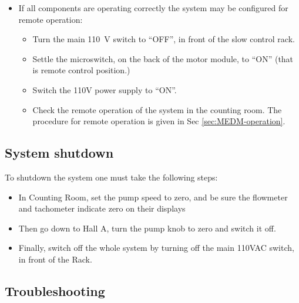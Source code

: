 {\begin{itemize}
\begin{itemize}
\item Switch the motor driver to ``manual'' mode. 
\item Go to the motor driver chassis and move the motor up and down by pressing
the switches on the front panel. 
\item Check that the motor is moving and make sure that the encoder display
is on, and working during the motor movement. 
\end{itemize}
\item If all components are operating correctly the system may be configured
for remote operation:

\begin{itemize}
\item Turn the main 110~V switch to ``OFF'', in front of
the slow control rack.
\item Settle the microswitch, on the back of the motor module, to ``ON''
(that is remote control position.)
\item Switch the 110V power supply to ``ON''.
\item Check the remote operation of the system in the counting room. The
procedure for remote operation is given in Sec \ref{sec:MEDM-operation}.
\end{itemize}
\end{itemize}

\subsection{System shutdown}

To shutdown the system one must take the following steps: 

\begin{itemize}
\item In Counting Room, set the pump speed to zero, and be sure the flowmeter
and tachometer indicate zero on their displays
\item Then go down to Hall A, turn the pump knob to zero and switch it off.
\item Finally, switch off the whole system by turning off the main 110VAC
switch, in front of the Rack.
\end{itemize}

\subsection{Troubleshooting}

}
